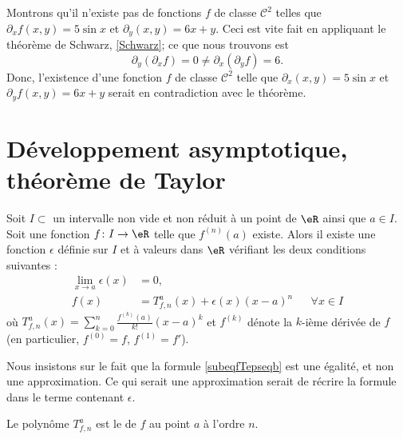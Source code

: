 \begin{example}
  Montrons qu'il n'existe pas de fonctions $f$ de classe $\mathcal{C}^2$ telles que $\partial_xf(x,y)= 5\sin x$ et $\partial_y(x,y)=6x+y$.  Ceci est vite fait en appliquant le théorème de Schwarz, \ref{Schwarz}; ce que nous trouvons est
\[
\partial_y (\partial_xf)= 0\neq \partial_x(\partial_yf)= 6.
\]
Donc, l'existence d'une fonction $f$ de classe $\mathcal{C}^2$ telle que $\partial_x(x,y)= 5\sin x$ et $\partial_yf(x,y)=6x+y$ serait en contradiction avec le théorème.  
\end{example}

\section{Développement asymptotique, théorème de Taylor}
\label{AppSecTaylorR}

\begin{theorem}		\label{ThoTaylor}
Soit $I\subset$ un intervalle non vide et non réduit à un point de $\eR$ ainsi que $a\in I$. Soit une fonction $f\colon I\to \eR$ telle que $f^{(n)}(a)$ existe. Alors il existe une fonction $\epsilon$ définie sur $I$ et à valeurs dans $\eR$ vérifiant les deux conditions suivantes :
\begin{subequations}		\label{SubEqsDevTauil}
	\begin{align}
		\lim_{x\to a}\epsilon(x)&=0,\\
		f(x)&=T^a_{f,n}(x)+\epsilon(x)(x-a)^{n}	&&\forall x\in I		\label{subeqfTepseqb}
	\end{align}
\end{subequations}
où $T^a_{f,n}(x)=\sum_{k=0}^n\frac{ f^{(k)}(a) }{ k! }(x-a)^k$ et $f^{(k)}$ dénote la $k$-ième dérivée de $f$ (en particulier, $f^{(0)}=f$, $f^{(1)}=f'$).
\end{theorem}

Nous insistons sur le fait que la formule \eqref{subeqfTepseqb} est une égalité, et non une approximation. Ce qui serait une approximation serait de récrire la formule dans le terme contenant $\epsilon$.

Le polynôme $T^a_{f,n}$ est le  de $f$ au point $a$ à l'ordre $n$. 

